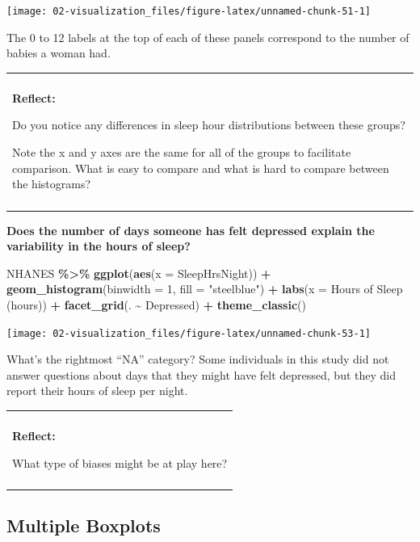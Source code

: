 \documentclass[
]{book}
\newenvironment{Shaded}{\begin{snugshade}}{\end{snugshade}}
\newcommand{\AttributeTok}[1]{\textcolor[rgb]{0.13,0.29,0.53}{#1}}
\newcommand{\DecValTok}[1]{\textcolor[rgb]{0.00,0.00,0.81}{#1}}
\newcommand{\FunctionTok}[1]{\textcolor[rgb]{0.13,0.29,0.53}{\textbf{#1}}}
\newcommand{\NormalTok}[1]{#1}
\newcommand{\SpecialCharTok}[1]{\textcolor[rgb]{0.81,0.36,0.00}{\textbf{#1}}}
\newcommand{\StringTok}[1]{\textcolor[rgb]{0.31,0.60,0.02}{#1}}
\newenvironment{reflect}
{
    \begin{center}
    
    \begin{tabular}{|p{0.8\textwidth}|}
    \rowcolor{LightBlue}
    \hline\\
    \rowcolor{LightBlue}
    \textbf{Reflect:}
}
{
    \\\rowcolor{LightBlue}
    \\\hline
    \end{tabular} 
    \end{center}
}
\begin{document}
\begin{center}\texttt{[image: 02-visualization\_files/figure-latex/unnamed-chunk-51-1]} \end{center}

The 0 to 12 labels at the top of each of these panels correspond to the number of babies a woman had.

\begin{reflect}
Do you notice any differences in sleep hour distributions between these
groups?

Note the x and y axes are the same for all of the groups to facilitate
comparison. What is easy to compare and what is hard to compare between
the histograms?
\end{reflect}

\textbf{Does the number of days someone has felt depressed explain the variability in the hours of sleep?}

\begin{Shaded}
\begin{Highlighting}[]
\NormalTok{NHANES }\SpecialCharTok{\%\textgreater{}\%}
    \FunctionTok{ggplot}\NormalTok{(}\FunctionTok{aes}\NormalTok{(}\AttributeTok{x =}\NormalTok{ SleepHrsNight)) }\SpecialCharTok{+}
    \FunctionTok{geom\_histogram}\NormalTok{(}\AttributeTok{binwidth =} \DecValTok{1}\NormalTok{, }\AttributeTok{fill =} \StringTok{"steelblue"}\NormalTok{) }\SpecialCharTok{+} 
    \FunctionTok{labs}\NormalTok{(}\AttributeTok{x =} \StringTok{\textquotesingle{}Hours of Sleep (hours)\textquotesingle{}}\NormalTok{) }\SpecialCharTok{+} 
    \FunctionTok{facet\_grid}\NormalTok{(. }\SpecialCharTok{\textasciitilde{}}\NormalTok{ Depressed) }\SpecialCharTok{+} 
    \FunctionTok{theme\_classic}\NormalTok{() }
\end{Highlighting}
\end{Shaded}

\begin{center}\texttt{[image: 02-visualization\_files/figure-latex/unnamed-chunk-53-1]} \end{center}

What's the rightmost ``NA'' category? Some individuals in this study did not answer questions about days that they might have felt depressed, but they did report their hours of sleep per night.

\begin{reflect}
What type of biases might be at play here?
\end{reflect}

\subsection{Multiple Boxplots}\label{multiple-boxplots}
\end{document}
